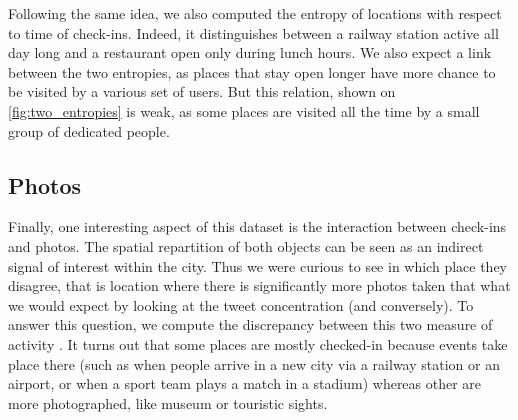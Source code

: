 Following the same idea, we also computed the entropy of locations with respect
to time of check-ins. Indeed, it distinguishes between a railway station active
all day long and a restaurant open only during lunch hours.  We also expect a
link between the two entropies, as places that stay open longer have more
chance to be visited by a various set of users. But this relation, shown on
\autoref{fig:two_entropies}  is weak, as some places are visited all the time by
a small group of dedicated people.



\subsection{Photos}

Finally, one interesting aspect of this dataset is the interaction between
check-ins and photos.  The spatial repartition of both objects can be seen as
an indirect signal of interest within the city. Thus we were curious to see in
which place they disagree, that is location where there is significantly more
photos taken that what we would expect by looking at the tweet concentration
(and conversely). To answer this question, we compute the discrepancy between
this two measure of activity \autocite{Agarwal2006spatial}. It turns out that
some places are mostly checked-in because events take place there (such as when
people arrive in a new city via a railway station or an airport, or when a
sport team plays a match in a stadium) whereas other are more photographed,
like museum or touristic sights.


\clearpage
